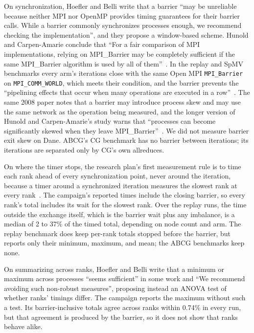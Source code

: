 \documentclass[11pt]{article}
\begin{document}
On synchronization, Hoefler and Belli write that a barrier ``may be unreliable because
neither MPI nor OpenMP provides timing guarantees for their barrier calls. While a
barrier commonly synchronizes processes enough, we recommend checking the
implementation'', and they propose a window-based scheme. Hunold and Carpen-Amarie
conclude that ``For a fair comparison of MPI implementations, relying on MPI\_Barrier may
be completely sufficient if the same MPI\_Barrier algorithm is used by all of
them''~\cite[Section~4.3]{hunold2016reproducible}. In the replay and SpMV benchmarks every
arm's iterations close with the same Open MPI \texttt{MPI\_Barrier} on
\texttt{MPI\_COMM\_WORLD}, which meets their condition, and the barrier prevents the
``pipelining effects that occur when many operations are executed in a
row''~\cite{hoefler2008accurately}. The same 2008 paper notes that a barrier may introduce process skew and may use the same
network as the operation being measured, and the longer version of Hunold and Carpen-Amarie's study warns that
``processes can become significantly skewed when they leave
MPI\_Barrier''~\cite{hunold2015mpibenchmarking}. We did not measure barrier exit skew on
Dane. ABCG's CG benchmark has no barrier between iterations; its iterations are
separated only by CG's own allreduces.

On where the timer stops, the research plan's first measurement rule is to time each
rank ahead of every synchronization point, never around the iteration, because a timer
around a synchronized iteration measures the slowest rank at every rank~\cite{researchplan}.
The campaign's reported times include the closing barrier, so every rank's total includes
its wait for the slowest rank. Over the replay runs, the time outside the exchange
itself, which is the barrier wait plus any imbalance, is a median of 2 to 37\% of the
timed total, depending on node count and arm. The replay benchmark does keep per-rank
totals stopped before the barrier, but reports only their minimum, maximum, and mean;
the ABCG benchmarks keep none.

On summarizing across ranks, Hoefler and Belli write that a minimum or maximum across
processes ``seems sufficient'' in some work and ``We recommend avoiding such non-robust
measures'', proposing instead an ANOVA test of whether ranks' timings differ. The
campaign reports the maximum without such a test. Its barrier-inclusive totals agree
across ranks within 0.74\% in every run, but that agreement is produced by the barrier,
so it does not show that ranks behave alike.
\end{document}
